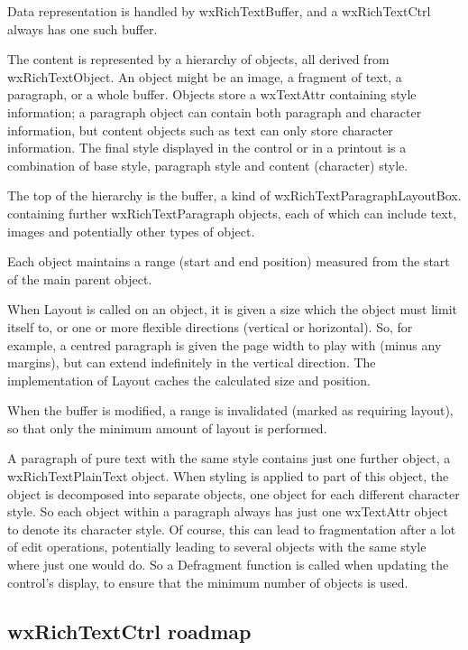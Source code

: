 Data representation is handled by wxRichTextBuffer, and a wxRichTextCtrl
always has one such buffer.

The content is represented by a hierarchy of objects, all derived from
wxRichTextObject. An object might be an image, a fragment of text, a paragraph,
or a whole buffer. Objects store a wxTextAttr containing style information;
a paragraph object can contain both paragraph and character information, but
content objects such as text can only store character information. The final
style displayed in the control or in a printout is a combination of base
style, paragraph style and content (character) style.

The top of the hierarchy is the buffer, a kind of wxRichTextParagraphLayoutBox.
containing further wxRichTextParagraph objects, each of which can include text,
images and potentially other types of object.

Each object maintains a range (start and end position) measured
from the start of the main parent object.

When Layout is called on an object, it is given a size which the object
must limit itself to, or one or more flexible directions (vertical
or horizontal). So, for example, a centred paragraph is given the page
width to play with (minus any margins), but can extend indefinitely
in the vertical direction. The implementation of Layout caches the calculated
size and position.

When the buffer is modified, a range is invalidated (marked as requiring
layout), so that only the minimum amount of layout is performed.

A paragraph of pure text with the same style contains just one further
object, a wxRichTextPlainText object. When styling is applied to part of
this object, the object is decomposed into separate objects, one object
for each different character style. So each object within a paragraph always has
just one wxTextAttr object to denote its character style. Of course, this can
lead to fragmentation after a lot of edit operations, potentially leading
to several objects with the same style where just one would do. So
a Defragment function is called when updating the control's display, to ensure that
the minimum number of objects is used.

\subsection{wxRichTextCtrl roadmap}


